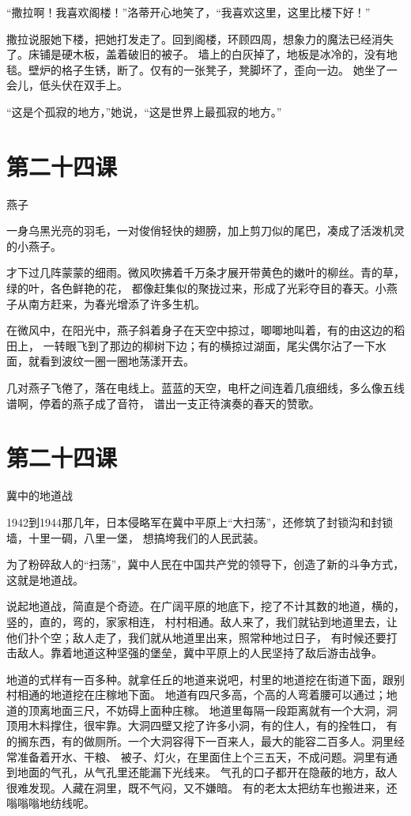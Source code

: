\documentclass[12pt,UTF8]{ctexbook}
\begin{document}
“撒拉啊！我喜欢阁楼！”洛蒂开心地笑了，“我喜欢这里，这里比楼下好！”

撒拉说服她下楼，把她打发走了。回到阁楼，环顾四周，想象力的魔法已经消失了。床铺是硬木板，盖着破旧的被子。
墙上的白灰掉了，地板是冰冷的，没有地毯。壁炉的格子生锈，断了。仅有的一张凳子，凳脚坏了，歪向一边。
她坐了一会儿，低头伏在双手上。

“这是个孤寂的地方，”她说，“这是世界上最孤寂的地方。”

\section{第二十四课}

燕子

一身乌黑光亮的羽毛，一对俊俏轻快的翅膀，加上剪刀似的尾巴，凑成了活泼机灵的小燕子。

才下过几阵蒙蒙的细雨。微风吹拂着千万条才展开带黄色的嫩叶的柳丝。青的草，绿的叶，各色鲜艳的花，
都像赶集似的聚拢过来，形成了光彩夺目的春天。小燕子从南方赶来，为春光增添了许多生机。

在微风中，在阳光中，燕子斜着身子在天空中掠过，唧唧地叫着，有的由这边的稻田上，
一转眼飞到了那边的柳树下边；有的横掠过湖面，尾尖偶尔沾了一下水面，就看到波纹一圈一圈地荡漾开去。

几对燕子飞倦了，落在电线上。蓝蓝的天空，电杆之间连着几痕细线，多么像五线谱啊，停着的燕子成了音符，
谱出一支正待演奏的春天的赞歌。

\section{第二十四课}

冀中的地道战

1942到1944那几年，日本侵略军在冀中平原上“大扫荡”，还修筑了封锁沟和封锁墙，十里一碉，八里一堡，
想搞垮我们的人民武装。

为了粉碎敌人的“扫荡”，冀中人民在中国共产党的领导下，创造了新的斗争方式，这就是地道战。

说起地道战，简直是个奇迹。在广阔平原的地底下，挖了不计其数的地道，横的，竖的，直的，弯的，家家相连，
村村相通。敌人来了，我们就钻到地道里去，让他们扑个空；敌人走了，我们就从地道里出来，照常种地过日子，
有时候还要打击敌人。靠着地道这种坚强的堡垒，冀中平原上的人民坚持了敌后游击战争。

地道的式样有一百多种。就拿任丘的地道来说吧，村里的地道挖在街道下面，跟别村相通的地道挖在庄稼地下面。
地道有四尺多高，个高的人弯着腰可以通过；地道的顶离地面三尺，不妨碍上面种庄稼。
地道里每隔一段距离就有一个大洞，洞顶用木料撑住，很牢靠。大洞四壁又挖了许多小洞，有的住人，有的拴牲口，
有的搁东西，有的做厕所。一个大洞容得下一百来人，最大的能容二百多人。洞里经常准备着开水、干粮、
被子、灯火，在里面住上个三五天，不成问题。洞里有通到地面的气孔，从气孔里还能漏下光线来。
气孔的口子都开在隐蔽的地方，敌人很难发现。人藏在洞里，既不气闷，又不嫌暗。
有的老太太把纺车也搬进来，还嗡嗡嗡地纺线呢。
\end{document}
